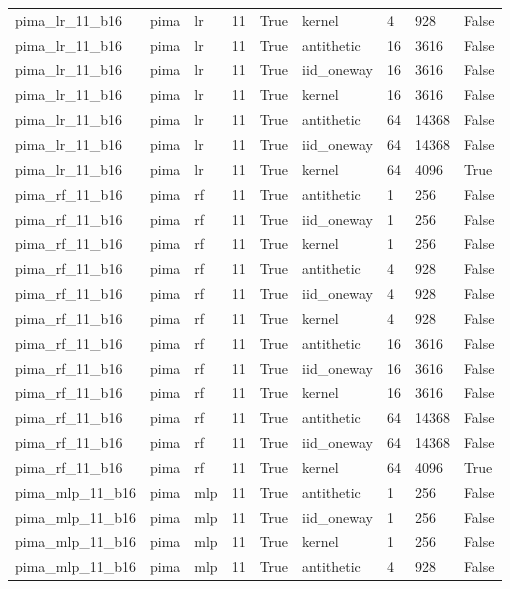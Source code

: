\begin{tabular}{lllllllll}
pima\_lr\_11\_b16 & pima & lr & 11 & True & kernel & 4 & 928 & False \\
pima\_lr\_11\_b16 & pima & lr & 11 & True & antithetic & 16 & 3616 & False \\
pima\_lr\_11\_b16 & pima & lr & 11 & True & iid\_oneway & 16 & 3616 & False \\
pima\_lr\_11\_b16 & pima & lr & 11 & True & kernel & 16 & 3616 & False \\
pima\_lr\_11\_b16 & pima & lr & 11 & True & antithetic & 64 & 14368 & False \\
pima\_lr\_11\_b16 & pima & lr & 11 & True & iid\_oneway & 64 & 14368 & False \\
pima\_lr\_11\_b16 & pima & lr & 11 & True & kernel & 64 & 4096 & True \\
pima\_rf\_11\_b16 & pima & rf & 11 & True & antithetic & 1 & 256 & False \\
pima\_rf\_11\_b16 & pima & rf & 11 & True & iid\_oneway & 1 & 256 & False \\
pima\_rf\_11\_b16 & pima & rf & 11 & True & kernel & 1 & 256 & False \\
pima\_rf\_11\_b16 & pima & rf & 11 & True & antithetic & 4 & 928 & False \\
pima\_rf\_11\_b16 & pima & rf & 11 & True & iid\_oneway & 4 & 928 & False \\
pima\_rf\_11\_b16 & pima & rf & 11 & True & kernel & 4 & 928 & False \\
pima\_rf\_11\_b16 & pima & rf & 11 & True & antithetic & 16 & 3616 & False \\
pima\_rf\_11\_b16 & pima & rf & 11 & True & iid\_oneway & 16 & 3616 & False \\
pima\_rf\_11\_b16 & pima & rf & 11 & True & kernel & 16 & 3616 & False \\
pima\_rf\_11\_b16 & pima & rf & 11 & True & antithetic & 64 & 14368 & False \\
pima\_rf\_11\_b16 & pima & rf & 11 & True & iid\_oneway & 64 & 14368 & False \\
pima\_rf\_11\_b16 & pima & rf & 11 & True & kernel & 64 & 4096 & True \\
pima\_mlp\_11\_b16 & pima & mlp & 11 & True & antithetic & 1 & 256 & False \\
pima\_mlp\_11\_b16 & pima & mlp & 11 & True & iid\_oneway & 1 & 256 & False \\
pima\_mlp\_11\_b16 & pima & mlp & 11 & True & kernel & 1 & 256 & False \\
pima\_mlp\_11\_b16 & pima & mlp & 11 & True & antithetic & 4 & 928 & False \\

\end{tabular}
